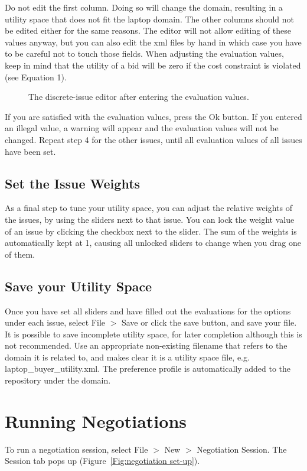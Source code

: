 \documentclass[]{article}
\begin{document}
Do not edit the first column. Doing so will change the domain, resulting in a utility space that does not fit the laptop domain. The other columns should not be edited either for the same reasons. The editor will not allow editing of these values anyway, but you can also edit the xml files by hand in which case you have to be careful not to touch those fields.
When adjusting the evaluation values, keep in mind that the utility of a bid will be zero if the cost constraint is violated (see Equation 1).

\begin{figure}
\caption{The discrete-issue editor after entering the evaluation values.}\label{Fig:discrete issue editor edited}
\end{figure}

If you are satisfied with the evaluation values, press the Ok button. If you entered an illegal value, a warning will appear and the evaluation values will not be changed. Repeat step 4 for the other issues, until all evaluation values of all issues have been set.

\subsection{Set the Issue Weights}
As a final step to tune your utility space, you can adjust the relative weights of the issues, by using the sliders next to that issue. You can lock the weight value of an issue by clicking the checkbox next to the slider. The sum of the weights is automatically kept at 1, causing all unlocked sliders to change when you drag one of them.

\subsection{Save your Utility Space}

Once you have set all sliders and have filled out the evaluations for the options under each issue, select File $>$ Save or click the save button, and save your file. It is possible to save incomplete utility space, for later completion although this is not recommended. Use an appropriate non-existing filename that refers to the domain it is related to, and makes clear it is a utility space file, e.g. laptop\_buyer\_utility.xml. The preference profile is automatically added to the repository under the domain.
 
\section{Running Negotiations}
To run a negotiation session, select File $>$ New $>$ Negotiation Session. The Session tab pops up (Figure~\ref{Fig:negotiation set-up}). 
\end{document}
